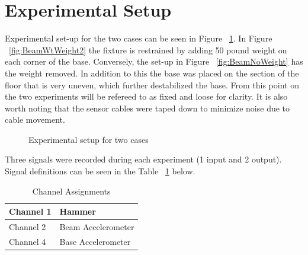 \documentclass[paper=a4, fontsize=12pt]{scrartcl} %
\begin{document}
\section*{Experimental Setup}
Experimental set-up for the two cases can be seen in Figure ~\ref{fig:test}. In Figure ~\ref{fig:BeamWtWeight2} the fixture is restrained by adding 50 pound weight on each corner of the base. Conversely, the set-up in Figure ~\ref{fig:BeamNoWeight} has the weight removed. In addition to this the base was placed on the section of the floor that is very uneven, which further destabilized the base. From this point on the two experiments will be refereed to as fixed and loose for clarity. It is also worth noting that the sensor cables were taped down to minimize noise due to cable movement.
%
	\begin{figure}[H]
		\centering
		\quad
		\caption{Experimental setup for two cases}
		\label{fig:test}
	\end{figure}
%
Three signals were recorded during each experiment (1 input and 2 output). Signal definitions can be seen in the Table ~\ref{table:channelAssignments} below.
%
\begin{table}[H]
\centering
\begin{tabular}{ l | l }
	\hline                       
		Channel 1 & Hammer \\
	\hline
		Channel 2 & Beam Accelerometer \\
	\hline
		Channel 4 & Base Accelerometer \\
	\hline  
\end{tabular}
\caption{Channel Assignments}
\label{table:channelAssignments}
\end{table}
\end{document}
